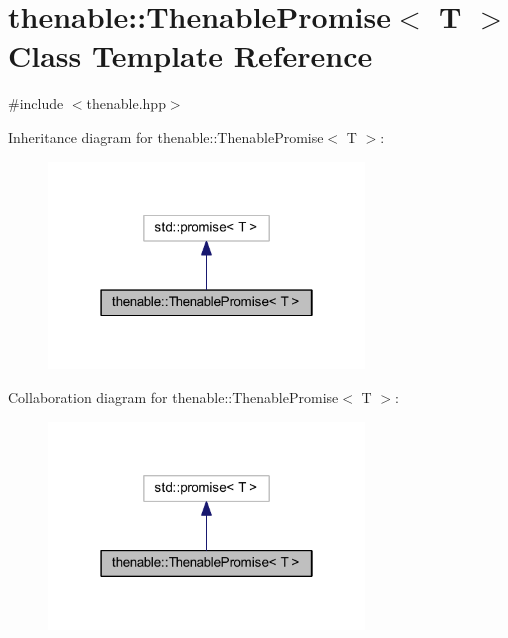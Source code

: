 \hypertarget{classthenable_1_1_thenable_promise}{}\section{thenable\+:\+:Thenable\+Promise$<$ T $>$ Class Template Reference}
\label{classthenable_1_1_thenable_promise}


{\ttfamily \#include $<$thenable.\+hpp$>$}



Inheritance diagram for thenable\+:\+:Thenable\+Promise$<$ T $>$\+:\nopagebreak
\begin{figure}[H]
\begin{center}
\leavevmode
\includegraphics[width=238pt]{classthenable_1_1_thenable_promise__inherit__graph}
\end{center}
\end{figure}


Collaboration diagram for thenable\+:\+:Thenable\+Promise$<$ T $>$\+:\nopagebreak
\begin{figure}[H]
\begin{center}
\leavevmode
\includegraphics[width=238pt]{classthenable_1_1_thenable_promise__coll__graph}
\end{center}
\end{figure}
